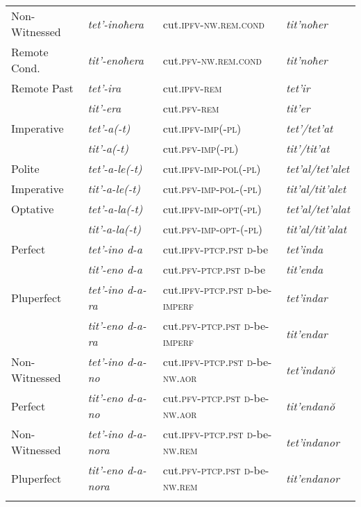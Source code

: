 {\begin{longtable}{ *4{l} }
Non-Witnessed   & \textit{tet'-inoħera} & cut.\textsc{ipfv-nw.rem.cond} & \textit{tit'noħer} \\
\quad Remote Cond. & \textit{tit'-enoħera} & cut.\textsc{pfv-nw.rem.cond} & \textit{tit'noħer} \\\addlinespace
 

Remote Past  & \textit{tet'-ira} & cut.\textsc{ipfv-rem} & \textit{tet'ir} \\
 & \textit{tit'-era} & cut.\textsc{pfv-rem} & \textit{tit'er} \\\addlinespace

Imperative  & \textit{tet'-a(-t)} & cut.\textsc{ipfv-imp(-pl)} & \textit{tet'\slash tet'at} \\
 & \textit{tit'-a(-t)} & cut.\textsc{pfv-imp(-pl)} & \textit{tit'\slash tit'at} \\\addlinespace
Polite   & \textit{tet'-a-le(-t)} & cut.\textsc{ipfv-imp-pol(-pl)} & \textit{tet'al\slash tet'alet} \\
\quad Imperative & \textit{tit'-a-le(-t)} & cut.\textsc{pfv-imp-pol-(-pl)} & \textit{tit'al\slash tit'alet} \\\addlinespace
Optative  & \textit{tet'-a-la(-t)} & cut.\textsc{ipfv-imp-opt(-pl)} & \textit{tet'al\slash tet'alat} \\
 & \textit{tit'-a-la(-t)} & cut.\textsc{pfv-imp-opt-(-pl)} & \textit{tit'al\slash tit'alat} \\

Perfect  & \textit{tet'-ino d-a} & cut.\textsc{ipfv-ptcp.pst d-}be & \textit{tet'inda} \\
  & \textit{tit'-eno d-a} & cut.\textsc{pfv-ptcp.pst d-}be & \textit{tit'enda} \\\addlinespace
  
Pluperfect   & \textit{tet'-ino d-a-ra} & cut.\textsc{ipfv-ptcp.pst d-}be-\textsc{imperf} & \textit{tet'indar} \\
  & \textit{tit'-eno d-a-ra} & cut.\textsc{pfv-ptcp.pst d-}be-\textsc{imperf} & \textit{tit'endar} \\\addlinespace
  
Non-Witnessed  & \textit{tet'-ino d-a-no} & cut.\textsc{ipfv-ptcp.pst d-}be-\textsc{nw.aor} & \textit{tet'indan\u{o}} \\
\quad Perfect  & \textit{tit'-eno d-a-no} & cut.\textsc{pfv-ptcp.pst d-}be-\textsc{nw.aor} & \textit{tit'endan\u{o}} \\  \addlinespace
  
Non-Witnessed & \textit{tet'-ino d-a-nora} & cut.\textsc{ipfv-ptcp.pst d-}be-\textsc{nw.rem} & \textit{tet'indanor} \\
\quad Pluperfect  & \textit{tit'-eno d-a-nora} & cut.\textsc{pfv-ptcp.pst d-}be-\textsc{nw.rem} & \textit{tit'endanor} \\ 
 
\lspbottomrule
\end{longtable}}
